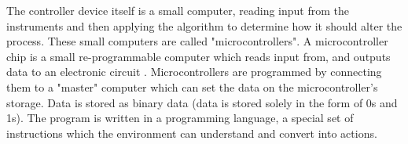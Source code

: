 \documentclass[twoside,a4]{report}
\def\br{\newline \newline \noindent}
\begin{document}
	The controller device itself is a small computer, reading input from the instruments and then applying the algorithm to determine how it should alter the process. These small computers are called "microcontrollers". A microcontroller chip is a small re-programmable computer which reads input from, and outputs data to an electronic circuit \cite{backwhatismc}. Microcontrollers are programmed by connecting them to a "master" computer which can set the data on the microcontroller's storage. Data is stored as binary data (data is stored solely in the form of 0s and 1s). The program is written in a programming language, a special set of instructions which the environment can understand and convert into actions. \br
	

	
\end{document}
